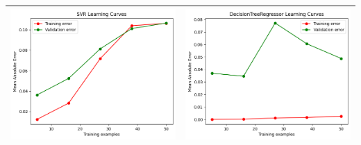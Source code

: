 \begin{table}[H]
    \centering
    \footnotesize
    \setlength\tabcolsep{0pt}
    \begin{tabularx}{\textwidth}{|X|X|}
        \hline
        \includegraphics[width=\linewidth, trim=0 0 0 0]{images/SVR_Azure_lc2.png} &
        \includegraphics[width=\linewidth, trim=0 0 0 0]{images/DecisionTree_Azure_lc2.png} \\
        \hline

\end{tabularx}
\end{table}
